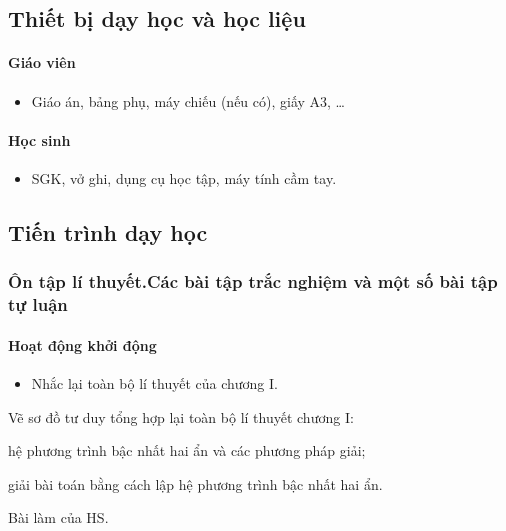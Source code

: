 \subsection{Thiết bị dạy học và học liệu}

\paragraph{Giáo viên}

\begin{itemize}
	\item Giáo án, bảng phụ, máy chiếu (nếu có), giấy A3, … 
\end{itemize}

\paragraph{Học sinh}

\begin{itemize}
	\item SGK, vở ghi, dụng cụ học tập, máy tính cầm tay.
\end{itemize}

\subsection{Tiến trình dạy học}

\danhsachtiet

\subsubsection
[Ôn tập lí thuyết. Các bài tập trắc nghiệm và một số bài tập tự luận]
{Ôn tập lí thuyết.\xuongdong Các bài tập trắc nghiệm và một số bài tập tự luận}

\paragraph{Hoạt động khởi động}

\muctieu

\begin{itemize}
	\item Nhắc lại toàn bộ lí thuyết của chương I.
\end{itemize}

\noidungsanpham

\begin{ontap}
	Vẽ sơ đồ tư duy tổng hợp lại toàn bộ lí thuyết chương I: 
	\begin{listEX}
		\item hệ phương trình bậc nhất hai ẩn và các phương pháp giải;
		\item giải bài toán bằng cách lập hệ phương trình bậc nhất hai ẩn.
	\end{listEX}
	\doicot
	Bài làm của HS.
\end{ontap}

